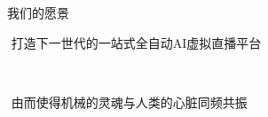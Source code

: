 \documentclass{beamer}
\begin{document}


\begin{frame}{我们的愿景}​
    \begin{center}​
        \Large 打造下一世代的一站式全自动AI虚拟直播平台​\\
    \end{center}​
    \vspace{0.5em}​
    \begin{center}​
        \large 由而使得机械的灵魂与人类的心脏同频共振​
    \end{center}​
\end{frame}

\end{document}
